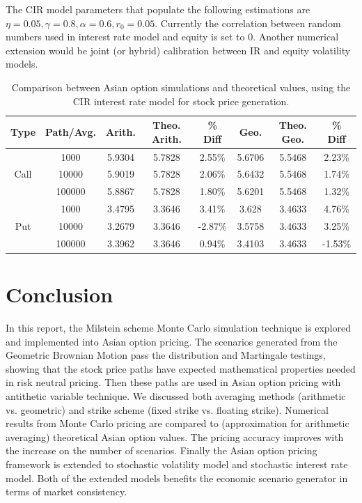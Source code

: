 \documentclass[a4paper,11pt] {article}
\begin{document}
The CIR model parameters that populate the following estimations are $\eta = 0.05, \gamma=0.8, \alpha = 0.6, r_0 =0.05$. Currently the correlation between random numbers used in interest rate model and equity is set to 0. Another numerical extension would be joint (or hybrid) calibration between IR and equity volatility models.

\begin{table}[htb]
\begin{center}
\begin{tabular}{c||c|c|c|c|c|c|c}
  \hline
  Type & Path/Avg. & Arith. & Theo. Arith. & \% Diff & Geo. & Theo. Geo. & \% Diff \\ \hline
\multirow{3}{*}{Call}	&	1000	&	5.9304	&	5.7828	&	2.55\%	&	5.6706	&	5.5468	&	2.23\%	\\
&	10000	&	5.9019	&	5.7828	&	2.06\%	&	5.6432	&	5.5468	&	1.74\%	\\
&	100000	&	5.8867	&	5.7828	&	1.80\%	&	5.6201	&	5.5468	&	1.32\%	\\  \hline
\multirow{3}{*}{Put}	&	1000	&	3.4795	&	3.3646	&	3.41\%	&	3.628	&	3.4633	&	4.76\%	\\
&	10000	&	3.2679	&	3.3646	&	-2.87\%	&	3.5758	&	3.4633	&	3.25\%	\\
&	100000	&	3.3962	&	3.3646	&	0.94\%	&	3.4103	&	3.4633	&	-1.53\%	\\
  \hline
\end{tabular}
\caption{Comparison between Asian option simulations and theoretical values, using the CIR interest rate model for stock price generation.}
\label{table::theo_vs_empi_cir}
\end{center}
\end{table}

\section{Conclusion}
In this report, the Milstein scheme Monte Carlo simulation technique is explored and implemented into Asian option pricing. The scenarios generated from the Geometric Brownian Motion pass the distribution and Martingale testings, showing that the stock price paths have expected mathematical properties needed in risk neutral pricing. Then these paths are used in Asian option pricing with antithetic variable technique. We discussed both averaging methods (arithmetic vs. geometric) and strike scheme (fixed strike vs. floating strike). Numerical results from Monte Carlo pricing are compared to (approximation for arithmetic averaging) theoretical Asian option values. The pricing accuracy improves with the increase on the number of scenarios. Finally the Asian option pricing framework is extended to stochastic volatility model and stochastic interest rate model. Both of the extended models benefits the economic scenario generator in terms of market consistency.


%
\end{document}
